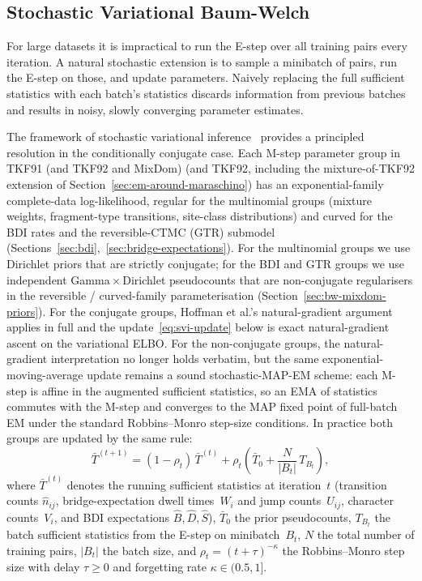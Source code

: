 \subsection{Stochastic Variational Baum-Welch}
\label{sec:svi-bw}

For large datasets it is impractical to run the E-step over all training pairs every iteration.
A natural stochastic extension is to sample a minibatch of pairs, run the E-step on those, and update parameters.
Naively replacing the full sufficient statistics with each batch's statistics discards information from previous batches
and results in noisy, slowly converging parameter estimates.

The framework of stochastic variational inference~\cite{hoffman2013svi}
provides a principled resolution in the conditionally conjugate case.
Each M-step parameter group in TKF91\ifdefined\MIXDOMPAPER{} (and TKF92 and MixDom)\else{} (and TKF92, including the mixture-of-TKF92 extension of Section~\ref{sec:em-around-maraschino})\fi{} has an
exponential-family complete-data log-likelihood, regular for the
multinomial groups (mixture weights, fragment-type transitions,
site-class distributions) and curved for the BDI rates and the
reversible-CTMC (GTR) submodel
(Sections~\ref{sec:bdi},~\ref{sec:bridge-expectations}).
For the multinomial groups we use Dirichlet priors that are strictly
conjugate; for the BDI and GTR groups we use independent
Gamma${}\times{}$Dirichlet pseudocounts that are non-conjugate
regularisers in the reversible / curved-family parameterisation
\ifdefined\MIXDOMPAPER (Section~\ref{sec:bw-mixdom-priors})\fi.
For the conjugate groups, Hoffman et al.'s natural-gradient argument
applies in full and the update~\eqref{eq:svi-update} below is exact
natural-gradient ascent on the variational ELBO.
For the non-conjugate groups, the natural-gradient interpretation no
longer holds verbatim, but the same exponential-moving-average update
remains a sound stochastic-MAP-EM scheme: each M-step is affine in the
augmented sufficient statistics, so an EMA of statistics commutes with
the M-step and converges to the MAP fixed point of full-batch EM under
the standard Robbins--Monro step-size conditions.  In practice both
groups are updated by the same rule:
\begin{equation}\label{eq:svi-update}
\bar{T}^{(t+1)} = (1 - \rho_t)\,\bar{T}^{(t)}
  + \rho_t\!\left(\bar{T}_0 + \frac{N}{|B_t|}\,T_{B_t}\right),
\end{equation}
where $\bar{T}^{(t)}$ denotes the running sufficient statistics
at iteration~$t$
(transition counts $\hat{n}_{ij}$,
bridge-expectation dwell times~$W_i$ and jump counts~$U_{ij}$,
character counts~$V_i$,
and BDI expectations $\hat{B}, \hat{D}, \hat{S}$),
$\bar{T}_0$ the prior pseudocounts,
$T_{B_t}$ the batch sufficient statistics from the E-step on minibatch~$B_t$,
$N$ the total number of training pairs,
$|B_t|$ the batch size,
and $\rho_t = (t + \tau)^{-\kappa}$ the Robbins--Monro step size
with delay $\tau \geq 0$ and forgetting rate $\kappa \in (0.5, 1]$.

